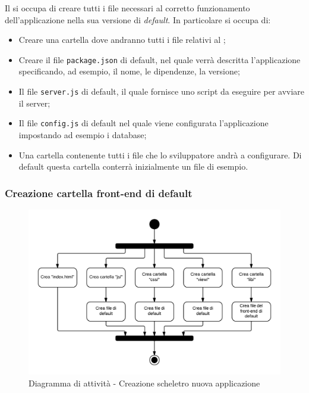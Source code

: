 Il   si occupa di creare tutti i file necessari al corretto funzionamento dell'applicazione nella sua versione di \textit{default}. In particolare si occupa di:

\begin{itemize}

	\item Creare una cartella dove andranno tutti i file relativi al ;
	\item Creare il file \texttt{package.json} di default, nel quale verrà descritta l'applicazione specificando, ad esempio, il nome, le dipendenze, la versione;
	\item Il file \texttt{server.js} di default, il quale fornisce uno script da eseguire per avviare il server;
	\item Il file \texttt{config.js} di default nel quale viene configurata l'applicazione impostando ad esempio i database;
	\item Una cartella contenente tutti i file  che lo sviluppatore andrà a configurare. Di default questa cartella conterrà inizialmente un file  di esempio.

\end{itemize}

\subsubsection{Creazione cartella front-end di default}

\begin{figure}[H]
\centering
\includegraphics[scale=0.2]{uml/attivita/Framework - Crea cartella front-end di default.png}
\caption{Diagramma di attività - Creazione scheletro nuova applicazione}
\end{figure}

